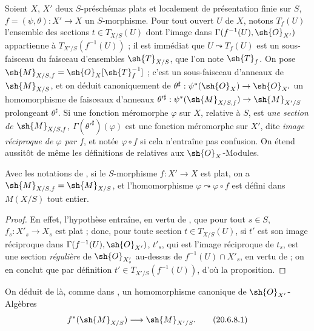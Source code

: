 \begin{env}[20.6.7]
Soient $X$, $X'$ deux $S$-préschémas plats et localement de présentation finie sur $S$, $f=(\psi,\theta):X'\to X$ un $S$-morphisme.
Pour tout ouvert $U$ de $X$, notons $T_f(U)$ l'ensemble des sections $t\in T_{X/S}(U)$ dont l'image dans $\Gamma(f^{-1}(U),\sh{O}_{X'})$ appartienne à $T_{X'/S}(f^{-1}(U))$ ; il est immédiat que $U\leadsto T_f(U)$ est un sous-faisceau du faisceau d'ensembles $\sh{T}_{X/S}$, que l'on note $\sh{T}_f$.
On pose $\sh{M}_{X/S,f}=\sh{O}_X[\sh{T}_f^{-1}]$ ; c'est un sous-faisceau d'anneaux de $\sh{M}_{X/S}$, et on déduit canoniquement de $\theta^\sharp: \psi^*(\sh{O}_X)\to\sh{O}_{X'}$ un homomorphisme de faisceaux d'anneaux $\theta'^\sharp: \psi^*(\sh{M}_{X/S,f})\to\sh{M}_{X'/S}$ prolongeant $\theta^\sharp$.
Si une fonction méromorphe $\varphi$ sur $X$, relative à $S$, est \emph{une section de $\sh{M}_{X/S,f}$}, $\Gamma(\theta'^\sharp)(\varphi)$ est une fonction méromorphe sur $X'$, dite \emph{image réciproque de $\varphi$ par $f$}, et notée $\varphi\circ f$ si cela n'entraîne pas confusion.
On étend aussitôt de même les définitions de  relatives aux $\sh{O}_X$-Modules.
\end{env}

\begin{proposition}[20.6.8]
\label{IV.20.6.8}
Avec les notations de , si le $S$-morphisme $f:X'\to X$ est plat, on a $\sh{M}_{X/S,f}=\sh{M}_{X/S}$, et l'homomorphisme $\varphi\leadsto\varphi\circ f$ est défini dans $M(X/S)$ tout entier.
\end{proposition}

\begin{proof}
En effet, l'hypothèse entraîne, en vertu de , que pour tout $s\in S$, $f_s:X'_s\to X_s$ est plat ; donc, pour toute section $t\in T_{X/S}(U)$, si $t'$ est son image réciproque dans $\Gamma(f^{-1}(U),\sh{O}_{X'})$, $t'_{s}$, qui est l'image réciproque de $t_s$, est une section \emph{régulière} de $\sh{O}_{X'_s}$ au-dessus de $f^{-1}(U)\cap X'_s$, en vertu de  ; on en conclut que par définition $t'\in T_{X'/S}(f^{-1}(U))$, d'où la proposition.
\end{proof}

On déduit de là, comme dans , un homomorphisme canonique de $\sh{O}_{X'}$-Algèbres
\[
\label{IV.20.6.8.1}
  f^*(\sh{M}_{X/S})\to\sh{M}_{X'/S}.
  \tag{20.6.8.1}
\]

